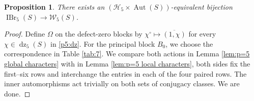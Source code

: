 \documentclass[11pt,a4paper]{article}
\numberwithin{equation}{section}
\newtheorem{proposition}[theorem]{Proposition}
\theoremstyle{definition}
\theoremstyle{remark}
\newcommand{\IBr}{\operatorname{IBr}}
\newcommand{\Aut}{\operatorname{Aut}}
\newcommand{\dz}{\operatorname{dz}}
\newcommand{\HH}{\mathcal H}
\begin{document}
\begin{proposition}\label{p5:prop:equivariant}
There exists an 
\((\HH_5\times\Aut(S))\)-equivalent bijection
\(\IBr_5(S)\longrightarrow\mathcal W_5(S)\).
\end{proposition}
\begin{proof}
Define \(\Omega\) on the defect-zero blocks by
$\chi^\circ\mapsto\overline{(1,\chi)}$ for every $\chi\in\dz_5(S)$ in \eqref{p5:dz}. For the principal block $B_0$, we choose the correspondence in Table \ref{tab:7}. We compare both actions in Lemma \ref{lem:p=5 global characters} with in Lemma \ref{lem:p=5 local characters},  both sides fix the first--six rows and interchange the entries in each of the four paired rows. The inner automorphisms act trivially on both sets of conjugacy classes. We are done.
\end{proof}
\end{document}
